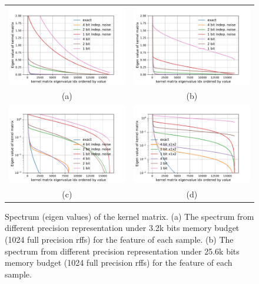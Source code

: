 \begin{figure}
	\centering
	\begin{tabular}{c c}
		\includegraphics[width=.45\linewidth]{figures/spectrum_1024_indep.pdf} &
		\includegraphics[width=.45\linewidth]{figures/spectrum_8192_indep.pdf} \\
		(a) & (b) \\
		\includegraphics[width=.45\linewidth]{figures/spectrum_1024_indep_log.pdf} &
		\includegraphics[width=.45\linewidth]{figures/spectrum_8192_indep_log.pdf} \\
		(c) & (d)
	\end{tabular}
	\caption{Spectrum (eigen values) of the kernel matrix. (a) The spectrum from different precision representation under 3.2k bits memory budget (1024 full precision rffs) for the feature of each sample. (b) The spectrum from different precision representation under 25.6k bits memory budget (1024 full precision rffs) for the feature of each sample.}
\end{figure}

%

